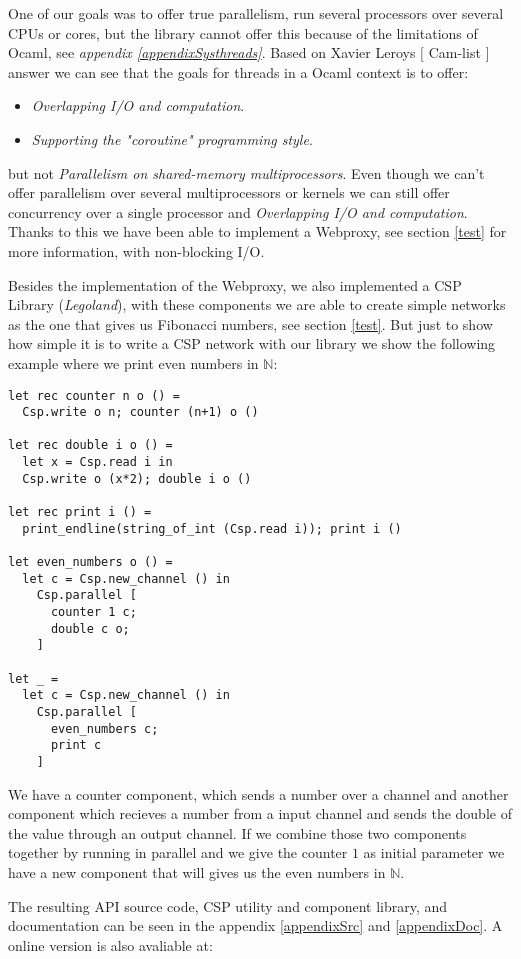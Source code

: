 \documentclass[a4paper,12pt]{article}
\begin{document}
One of our goals was to offer true parallelism, run several processors
over several CPUs or cores, but the library cannot offer this because of the
limitations of Ocaml, see {\it appendix \ref{appendixSysthreads}}. Based on
Xavier Leroys $[$ Cam-list $]$ answer we can see that the goals for threads in a
Ocaml context is to offer:
\begin{itemize}
 \item {\it Overlapping I/O and computation}.
 \item {\it Supporting the "coroutine" programming style}.
\end{itemize}
but not {\it Parallelism on shared-memory multiprocessors}. Even though we can't
offer parallelism over several multiprocessors or kernels we can still offer
concurrency over a single processor and {\it Overlapping I/O and computation}.
Thanks to this we have been able to implement a Webproxy, see section \ref{test}
for more information, with non-blocking I/O.

Besides the implementation of the Webproxy, we also implemented a CSP
Library ({\it Legoland\cite{vinterpycsp}}), with these components we are able to
create simple networks as the one that gives us Fibonacci numbers, see section
\ref{test}. But just to show how simple it is to write a CSP network with our
library we show the following example where we print even numbers in $\mathbb{N}$:
\newpage
\begin{verbatim}
let rec counter n o () =
  Csp.write o n; counter (n+1) o ()

let rec double i o () =
  let x = Csp.read i in
  Csp.write o (x*2); double i o ()

let rec print i () =
  print_endline(string_of_int (Csp.read i)); print i ()

let even_numbers o () =
  let c = Csp.new_channel () in
    Csp.parallel [
      counter 1 c;
      double c o;
    ]

let _ =
  let c = Csp.new_channel () in
    Csp.parallel [
      even_numbers c;
      print c
    ]
\end{verbatim}
We have a counter component, which sends a number over a channel and another
component which recieves a number from a input channel and sends the
double of the value through an output channel. If we combine those two
components together by running in parallel and we give the counter $1$ as
initial parameter we have a new component that will gives us the even numbers in
$\mathbb{N}$.

The resulting API source code, CSP utility and component library, and
documentation can be seen in the appendix \ref{appendixSrc} and \ref{appendixDoc}.
A online version is also avaliable at:
\end{document}
